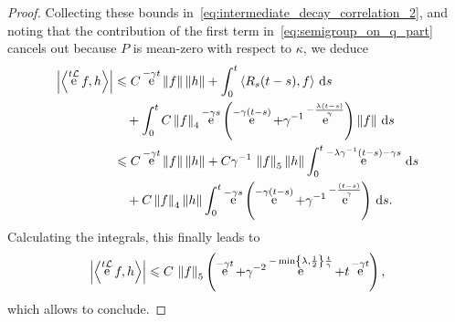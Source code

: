 \documentclass[11pt,a4paper]{article}
\DeclareMathOperator{\e}{e}
\renewcommand{\d}{\mathrm d}
\theoremstyle{plain}
\numberwithin{equation}{section}
\renewcommand{\leq}{\leqslant}
\begin{document}
\begin{proof}
    Collecting these bounds in~\eqref{eq:intermediate_decay_correlation_2},
    and noting that the contribution of the first term in~\eqref{eq:semigroup_on_q_part} cancels out because $P$ is mean-zero with respect to $\kappa$,
    we deduce
    \begin{align*}
        \label{eq:intermediate_decay_correlation_3}
        \abs{ \ip{\e^{t \mathcal L} f}{h}}
        &\leq C \e^{-\gamma t} \norm{f} \norm{h}
        + \int_{0}^t \ip{R_s(t-s)}{f} \, \d s \\
        &\quad + \int_{0}^t C \norm{f}[4] \e^{-\gamma s}\left(\e^{-\gamma (t-s)} + \gamma^{-1} \e^{-\frac{\lambda(t-s)}{\gamma}} \right) \norm{f} \, \d s \\
        &\leq C \e^{-\gamma t} \norm{f} \norm{h}
        + C \gamma^{-1} \, \norm{f}_5  \norm{h} \int_{0}^{t}  \e^{-\lambda \gamma^{-1} (t-s) - \gamma s} \, \d s \\
        &\quad+ C \norm{f}[4] \norm{h} \int_{0}^t \e^{-\gamma s}\left(\e^{-\gamma (t-s)} + \gamma^{-1} \e^{-\frac{(t-s)}{\gamma}} \right) \, \d s.
    \end{align*}
    Calculating the integrals, this finally leads to
    \begin{align*}
        \abs{ \ip{\e^{t \mathcal L} f}{h}}
        \leq C \, \norm{f}_5
        \left( \e^{-\gamma t} +  \gamma^{-2} \e^{-\min\left\{\lambda, \frac{1}{2}\right\} \frac{t}{\gamma}} + t\e^{-\gamma t} \right),
    \end{align*}
    which allows to conclude.
\end{proof}






% 
% 
% 
\printbibliography
\end{document}
